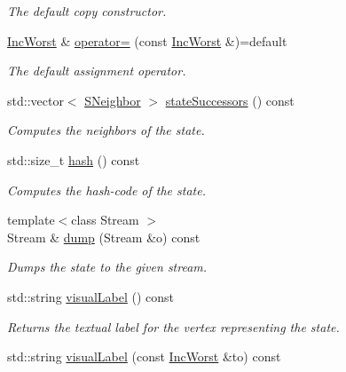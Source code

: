 \begin{DoxyCompactItemize}
\begin{DoxyCompactList}\small\item\em The default copy constructor. \end{DoxyCompactList}\item 
\hyperlink{structincWorst_1_1IncWorst}{Inc\+Worst} \& \hyperlink{structincWorst_1_1IncWorst_a425c0d30c1845bba61d68cb8b07b3b83}{operator=} (const \hyperlink{structincWorst_1_1IncWorst}{Inc\+Worst} \&)=default
\begin{DoxyCompactList}\small\item\em The default assignment operator. \end{DoxyCompactList}\item 
std\+::vector$<$ \hyperlink{structincWorst_1_1IncWorst_ad762108f9045255b905bf3495af469d6}{S\+Neighbor} $>$ \hyperlink{structincWorst_1_1IncWorst_ab895800d1feb2ac2492a0d0c20d3dd2f}{state\+Successors} () const 
\begin{DoxyCompactList}\small\item\em Computes the neighbors of the state. \end{DoxyCompactList}\item 
std\+::size\+\_\+t \hyperlink{structincWorst_1_1IncWorst_a91277d450137496d1e722e7f35b5be9d}{hash} () const 
\begin{DoxyCompactList}\small\item\em Computes the hash-\/code of the state. \end{DoxyCompactList}\item 
{\footnotesize template$<$class Stream $>$ }\\Stream \& \hyperlink{structincWorst_1_1IncWorst_afa8173c47e8632ed84068454d6b8920a}{dump} (Stream \&o) const 
\begin{DoxyCompactList}\small\item\em Dumps the state to the given stream. \end{DoxyCompactList}\item 
std\+::string \hyperlink{structincWorst_1_1IncWorst_a96eddb68ce37523e2c15d164e4483c9c}{visual\+Label} () const 
\begin{DoxyCompactList}\small\item\em Returns the textual label for the vertex representing the state. \end{DoxyCompactList}\item 
std\+::string \hyperlink{structincWorst_1_1IncWorst_aace0d471d214d6ba80aacd98a5029e55}{visual\+Label} (const \hyperlink{structincWorst_1_1IncWorst}{Inc\+Worst} \&to) const 

\end{DoxyCompactItemize}
